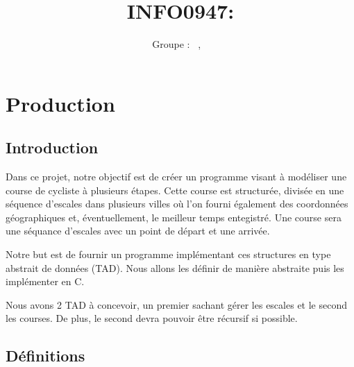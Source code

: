 \documentclass[a4paper, 11pt, oneside]{article}
\title{INFO0947: \intitule}
\author{Groupe \GrNbr : \PrenomUN~\textsc{\NomUN}, \PrenomDEUX~\textsc{\NomDEUX}}
\date{}
\begin{document}
\maketitle


\section{Production}


\subsection{Introduction}

Dans ce projet, notre objectif est de créer un programme visant à modéliser une
course de cycliste à plusieurs étapes. Cette course est structurée, divisée en
une séquence d'escales dans plusieurs villes où l'on fourni également des 
coordonnées géographiques et, éventuellement, le meilleur temps entegistré. Une 
course sera une séquance d'escales avec un point de départ et une arrivée.

\vspace{0.4cm}

Notre but est de fournir un programme implémentant ces structures en type
abstrait de données (TAD). Nous allons les définir de manière abstraite puis les
implémenter en C.

\vspace{0.4cm}

Nous avons 2 TAD à concevoir, un premier sachant gérer les escales et le second
les courses. De plus, le second devra pouvoir être récursif si possible.

\subsection{Définitions}
\end{document}
